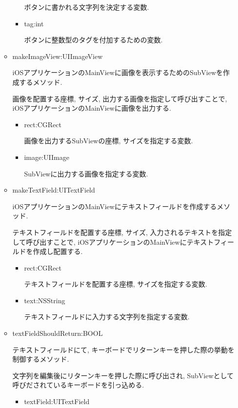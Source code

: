 \begin{itemize}
\begin{itemize}
\begin{itemize}
ボタンに書かれる文字列を決定する変数.

\item tag:int

ボタンに整数型のタグを付加するための変数.
\end{itemize}

\item makeImageView:UIImageView

iOSアプリケーションのMainViewに画像を表示するためのSubViewを作成するメソッド.

画像を配置する座標, サイズ, 出力する画像を指定して呼び出すことで, iOSアプリケーションのMainViewに画像を出力する.

\begin{itemize}
\item rect:CGRect

画像を出力するSubViewの座標, サイズを指定する変数.

\item image:UIImage

SubViewに出力する画像を指定する変数.
\end{itemize}

\item makeTextField:UITextField

iOSアプリケーションのMainViewにテキストフィールドを作成するメソッド.

テキストフィールドを配置する座標, サイズ, 入力されるテキストを指定して呼び出すことで, iOSアプリケーションのMainViewにテキストフィールドを作成し配置する.

\begin{itemize}
\item rect:CGRect

テキストフィールドを配置する座標, サイズを指定する変数.

\item text:NSString

テキストフィールドに入力する文字列を指定する変数.
\end{itemize}

\item textFieldShouldReturn:BOOL

テキストフィールドにて, キーボードでリターンキーを押した際の挙動を制御するメソッド.

文字列を編集後にリターンキーを押した際に呼び出され, SubViewとして呼びだされているキーボードを引っ込める.

\begin{itemize}
\item textField:UITextField


\end{itemize}
\end{itemize}
\end{itemize}
